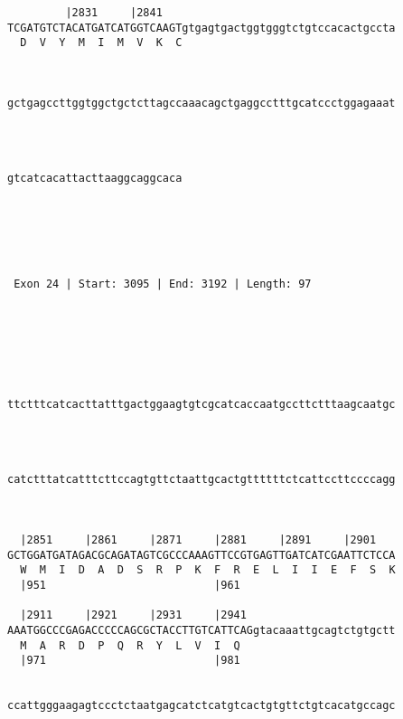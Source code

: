 \documentclass{article}
\begin{document}
\begin{Verbatim}
         |2831     |2841                                    
TCGATGTCTACATGATCATGGTCAAGTgtgagtgactggtgggtctgtccacactgccta
  D  V  Y  M  I  M  V  K  C                                 
                                                          
   
                                                            
gctgagccttggtggctgctcttagccaaacagctgaggcctttgcatccctggagaaat
                                                            
                                                            
   
                           
gtcatcacattacttaaggcaggcaca
                           
                           
  



 Exon 24 | Start: 3095 | End: 3192 | Length: 97 





   
                                                            
ttctttcatcacttatttgactggaagtgtcgcatcaccaatgccttctttaagcaatgc
                                                            
                                                            
   
                                                            
catctttatcatttcttccagtgttctaattgcactgttttttctcattccttccccagg
                                                            
                                                            
   
  |2851     |2861     |2871     |2881     |2891     |2901   
GCTGGATGATAGACGCAGATAGTCGCCCAAAGTTCCGTGAGTTGATCATCGAATTCTCCA
  W  M  I  D  A  D  S  R  P  K  F  R  E  L  I  I  E  F  S  K
  |951                          |961                        
   
  |2911     |2921     |2931     |2941                       
AAATGGCCCGAGACCCCCAGCGCTACCTTGTCATTCAGgtacaaattgcagtctgtgctt
  M  A  R  D  P  Q  R  Y  L  V  I  Q                        
  |971                          |981                        
   
                                                            
ccattgggaagagtccctctaatgagcatctcatgtcactgtgttctgtcacatgccagc
                                                            
                                                            
   

\end{Verbatim}
\end{document}
